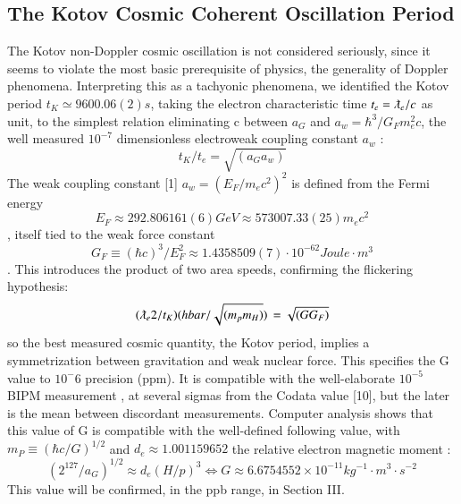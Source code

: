 \documentclass[twoside,draft]{article}
\begin{document}
{\subsection{The Kotov Cosmic Coherent Oscillation Period}

The Kotov non-Doppler cosmic oscillation \cite{Lyuty} is not considered seriously, since it seems to
violate the most basic prerequisite of physics, the generality of Doppler phenomena. Interpreting
this as a tachyonic phenomena, we identified the Kotov period $t_{K} \simeq 9600.06(2) s$, taking the electron
characteristic time $t_{e} = \lambdabar_{e} /c$ as unit, to the simplest relation eliminating c between $a_{G}$ and $a_{w}=
\hbar^{3} /G_{F} m_{e}^{2} c$, the well measured $10^{-7}$ dimensionless electroweak coupling constant $a_{w}$ :
\begin{equation}
t_{K} / t_{e} = \sqrt{(a_{G} a_{w})}
\end{equation}
The weak coupling constant [1] $a_{w} = (E_{F} /m_{e} c^{2} )^{2}$ is defined from the Fermi energy 
\begin{equation}
E_{F} \approx 292.806161(6) GeV \approx 573007.33(25) m_{e} c^{2}
\end{equation}, itself tied to the weak force constant 
\begin{equation}
G_{F} \equiv (\hbar c)^{3} /E_{F}^{2} \approx
1.4358509(7) \cdot 10^{-62} Joule \cdot m^{3}
\end{equation}
\cite{Pdc}. This introduces the product of two area speeds, confirming the
flickering hypothesis:
\begin{equation}
(\lambdabar_{e} 2/t_{K} )(hbar/\sqrt{(m_{p} m_{H})})\, = \sqrt{(GG_{F})}
\end{equation}
so the best measured cosmic quantity, the Kotov period, implies a symmetrization between
gravitation and weak nuclear force. This specifies the G value to $10^-{6}$ precision (ppm). It is
compatible with the well-elaborate $10^{-5}$ BIPM measurement \cite{Quinn}, at several sigmas from the Codata
value [10], but the later is the mean between discordant measurements.
Computer analysis shows that this value of G is compatible with the well-defined following
value, with $m_{P} \equiv (\hbar c/G)^{1/2}$ and $d_{e} \approx 1.001159652$ the relative electron magnetic moment :
\begin{equation}
(2^{127} /a_{G} )^{1/2} \approx d_{e} (H/p)^{3}
\Leftrightarrow G \approx 6.6754552 \times 10^{-11} kg^{-1} \cdot m^{3} \cdot s^{-2}
\end{equation}
This value will be confirmed, in the ppb range, in Section III.

}
\end{document}
